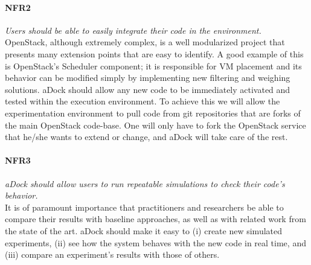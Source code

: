 \paragraph{NFR2}\label{p:nfr2} \emph{Users should be able to easily integrate their code in the environment.} \hfill \\
 OpenStack, although extremely complex, is a well modularized project that presents many extension points that are easy to identify. A good example of this is OpenStack's Scheduler component; it is responsible for VM placement and its behavior can be modified simply by implementing new filtering and weighing solutions. aDock should allow any new code to be immediately activated and tested within the execution environment. To achieve this we will allow the experimentation environment to pull code from git repositories that are forks of the main OpenStack code-base. One will only have to fork the OpenStack service that he/she wants to extend or change, and aDock will take care of the rest.  

\paragraph{NFR3}\label{p:nfr3} \emph{aDock should allow users to run repeatable simulations to check their code's behavior.} \hfill \\
 It is of paramount importance that practitioners and researchers be able to compare their results with baseline approaches, as well as with related work from the state of the art. aDock should make it easy to (i) create new simulated experiments, (ii) see how the system behaves with the new code in real time, and (iii) compare an experiment's results with those of others.
